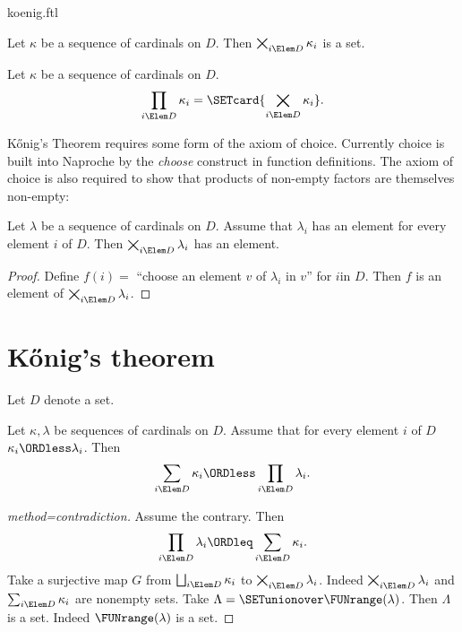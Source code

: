 \documentclass{stex}
\newcommand{\SumSet}[2]{\bigsqcup_{i \Elem #2} #1_{i}}
\newcommand{\Sum}[2]{\sum_{i \Elem #2} #1_{i}}
\newcommand{\ProdSet}[2]{\bigtimes_{i \Elem #2} #1_{i}}
\newcommand{\Prod}[2]{\prod_{i \Elem #2} #1_{i}}
\begin{document}
\begin{smodule}{koenig.ftl}
\begin{forthel}
  \begin{axiom*}
    Let $\kappa$ be a sequence of cardinals on $D$.
    Then $\ProdSet{\kappa}{D}$ is a set.
  \end{axiom*}

  \begin{definition*}
    Let $\kappa$ be a sequence of cardinals on $D$.
    \[ \Prod{\kappa}{D} = \SETcard{ \ProdSet{\kappa}{D} }. \]
  \end{definition*}
\end{forthel}

Kőnig's Theorem requires some form of the axiom of choice.
Currently choice is built into Naproche by the \emph{choose} construct in
function definitions.
The axiom of choice is also required to show that products of non-empty factors
are themselves non-empty:

\begin{forthel}
  \begin{lemma*}[title=Choice]
    Let $\lambda$ be a sequence of cardinals on $D$.
    Assume that $\lambda_{i}$ has an element for every element $i$ of $D$.
    Then $\ProdSet{\lambda}{D}$ has an element.
  \end{lemma*}
  \begin{proof}
    Define $f(i) =$ ``choose an element $v$ of $\lambda_{i}$ in $v$'' for $i$in $D$.
    Then $f$ is an element of $\ProdSet{\lambda}{D}$.
  \end{proof}
\end{forthel}


\section*{Kőnig's theorem}

\begin{forthel}
  Let $D$ denote a set.

  \begin{theorem*}[title=Kőnig,name=Koenig]
    Let $\kappa, \lambda$ be sequences of cardinals on $D$.
    Assume that for every element $i$ of $D$ $\kappa_{i} \ORDless \lambda_{i}$.
    Then \[ \Sum{\kappa}{D} \ORDless \Prod{\lambda}{D}. \]
  \end{theorem*}
  \begin{proof}[method=contradiction]
    Assume the contrary.
    Then \[ \Prod{\lambda}{D} \ORDleq \Sum{\kappa}{D}. \]
    Take a surjective map $G$ from $\SumSet{\kappa}{D}$ to $\ProdSet{\lambda}{D}$.
    Indeed $\ProdSet{\lambda}{D}$ and $\Sum{\kappa}{D}$ are nonempty sets.
    Take $\Lambda = \SETunionover \FUNrange(\lambda)$.
    Then $\Lambda$ is a set.
    Indeed $\FUNrange(\lambda)$ is a set.


\end{proof}
\end{forthel}
\end{smodule}
\end{document}
